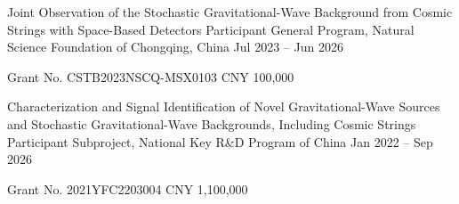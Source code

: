 \begin{cventries}
  \vspace{0.1em}
  \fundingentry
    {Joint Observation of the Stochastic Gravitational-Wave Background from Cosmic Strings with Space-Based Detectors}
    {Participant}
    {General Program, Natural Science Foundation of Chongqing, China}
    {Jul 2023 -- Jun 2026}
    {
      \begin{cvitems}
        \item{Grant No. CSTB2023NSCQ-MSX0103 \textperiodcentered{} CNY 100,000}
      \end{cvitems}
    }

  \vspace{0.1em}
  \fundingentry
    {Characterization and Signal Identification of Novel Gravitational-Wave Sources and Stochastic Gravitational-Wave Backgrounds, Including Cosmic Strings}
    {Participant}
    {Subproject, National Key R\&D Program of China}
    {Jan 2022 -- Sep 2026}
    {
      \begin{cvitems}
        \item{Grant No. 2021YFC2203004 \textperiodcentered{} CNY 1,100,000}
      \end{cvitems}
    }

\end{cventries}
